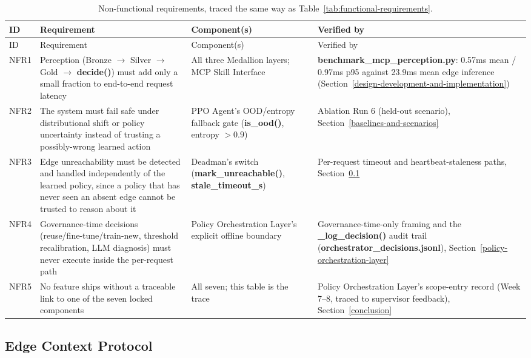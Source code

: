 {\small\setlength{\tabcolsep}{4pt}
\begin{longtable}{p{0.9cm}p{5.2cm}p{3.2cm}p{4.2cm}}
\caption{Non-functional requirements, traced the same way as
Table~\ref{tab:functional-requirements}.}\label{tab:nonfunctional-requirements}\\
\toprule ID & Requirement & Component(s) & Verified by \\ \midrule
\endfirsthead
\toprule ID & Requirement & Component(s) & Verified by \\ \midrule
\endhead
NFR1 & Perception (Bronze $\to$ Silver $\to$ Gold $\to$
\textbf{decide()}) must add only a small fraction to end-to-end
request latency & All three Medallion layers; MCP Skill
Interface & \textbf{benchmark\_mcp\_perception.py}: 0.57ms mean / 0.97ms
p95 against 23.9ms mean edge inference (Section~\ref{design-development-and-implementation}) \\
NFR2 & The system must fail safe under distributional shift or policy
uncertainty instead of trusting a possibly-wrong learned action & PPO
Agent's OOD/entropy fallback gate (\textbf{is\_ood()}, entropy $>0.9$)
& Ablation Run 6 (held-out scenario), Section~\ref{baselines-and-scenarios} \\
NFR3 & Edge unreachability must be detected and handled independently
of the learned policy, since a policy that has never seen an absent
edge cannot be trusted to reason about it & Deadman's switch
(\textbf{mark\_unreachable()}, \textbf{stale\_timeout\_s}) & Per-request
timeout and heartbeat-staleness paths, Section~\ref{edge-context-protocol} \\
NFR4 & Governance-time decisions (reuse/fine-tune/train-new, threshold
recalibration, LLM diagnosis) must never execute inside the per-request
path & Policy Orchestration Layer's explicit offline boundary &
Governance-time-only framing and the \textbf{\_log\_decision()}
audit trail (\textbf{orchestrator\_decisions.jsonl}), Section~\ref{policy-orchestration-layer} \\
NFR5 & No feature ships without a traceable link to one of the seven
locked components & All seven; this table is the trace & Policy
Orchestration Layer's scope-entry record (Week 7--8, traced to
supervisor feedback), Section~\ref{conclusion} \\
\bottomrule \end{longtable}}

\hypertarget{edge-context-protocol}{%
\subsection{Edge Context Protocol}\label{edge-context-protocol}}

